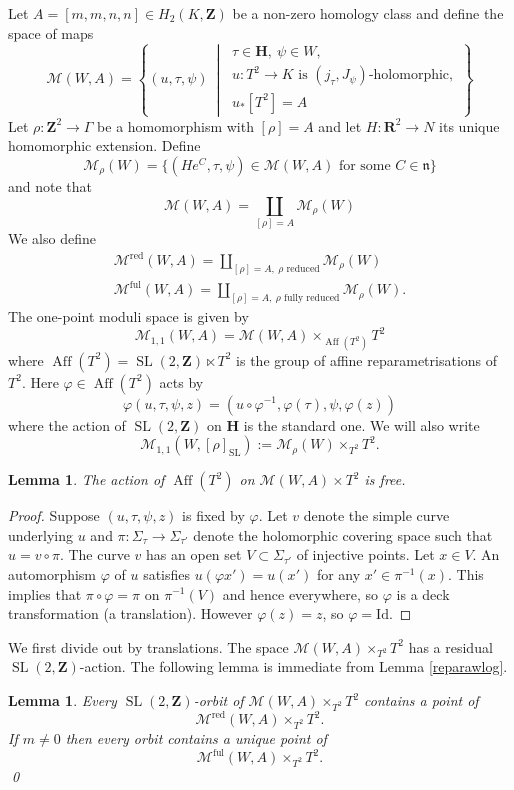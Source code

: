 \documentclass[11pt]{amsart}
\newcommand{\mM}{\mathcal{M}}
\newcommand{\HH}{\mathbf{H}}
\newcommand{\RR}{\mathbf{R}}
\newcommand{\ZZ}{\mathbf{Z}}
\newcommand{\id}{\mathrm{Id}}
\newcommand{\WW}{W}
\newcommand{\nn}{\mathfrak{n}}
\renewcommand{\phi}{\varphi}
\newcommand{\OP}{\operatorname}
\numberwithin{equation}{section}
\newtheorem{lma}[equation]{Lemma}
\theoremstyle{definition}
\theoremstyle{remark}
\begin{document}
Let $A=[m,m,n,n]\in H_2(K,\ZZ)$ be a non-zero homology class and define the space of maps
\[
\mM(\WW,A)=\left\{(u,\tau,\psi)\ \middle|\ \begin{array}{l}\tau\in\HH,\ \psi\in\WW,\\
u\colon T^2\to K\mbox{ is }(j_{\tau},J_{\psi})\mbox{-holomorphic},\\
u_*[T^2]=A\end{array}\right\}\]
Let $\rho\colon\ZZ^2\to\Gamma$ be a homomorphism with $[\rho]=A$ and let $H\colon\RR^2\to N$ its unique homomorphic extension. Define
\[\mM_{\rho}(\WW)=\{(He^C,\tau,\psi)\in\mM(\WW,A)\mbox{ for some }C\in\nn\}\]
and note that
\[\mM(\WW,A)=\coprod_{[\rho]=A}\mM_{\rho}(\WW)\]
We also define
\begin{gather*}
\mM^{\mathrm{red}}(\WW,A)=\coprod_{[\rho]=A,\ \rho\mbox{ reduced}}\mM_{\rho}(\WW)\\
\mM^{\mathrm{ful}}(\WW,A)=\coprod_{[\rho]=A,\ \rho\mbox{ fully reduced}}\mM_{\rho}(\WW).
\end{gather*} The one-point moduli space is given by
\[\mM_{1,1}(\WW,A)=\mM(\WW,A)\times_{\OP{Aff}(T^2)} T^2\]
where $\OP{Aff}(T^2)=\OP{SL}(2,\ZZ)\ltimes T^2$ is the group of affine reparametrisations of~$T^2$. Here $\phi\in\OP{Aff}(T^2)$ acts by
\[\phi(u,\tau,\psi,z)=(u\circ\phi^{-1},\phi(\tau),\psi,\phi(z))\]
where the action of $\OP{SL}(2,\ZZ)$ on $\HH$ is the standard one. We will also write
\[\mM_{1,1}(\WW,[\rho]_{\OP{SL}}):=\mM_{\rho}(\WW)\times_{T^2}T^2.\]
\begin{lma}\label{noautos}
The action of $\OP{Aff}(T^2)$ on $\mM(\WW,A)\times T^2$ is free.
\end{lma}
\begin{proof}
Suppose $(u,\tau,\psi,z)$ is fixed by $\phi$. Let $v$ denote the simple curve underlying $u$ and $\pi\colon \Sigma_{\tau}\to \Sigma_{\tau'}$ denote the holomorphic covering space such that $u=v\circ\pi$. The curve $v$ has an open set $V\subset\Sigma_{\tau'}$ of injective points. Let $x\in V$. An automorphism $\phi$ of $u$ satisfies $u(\phi x')=u(x')$ for any $x'\in\pi^{-1}(x)$. This implies that $\pi\circ\phi=\pi$ on $\pi^{-1}(V)$ and hence everywhere, so $\phi$ is a deck transformation (a translation). However $\phi(z)=z$, so $\phi=\id$.
\end{proof}
We first divide out by translations. The space $\mM(\WW,A)\times_{T^2}T^2$ has a residual $\OP{SL}(2,\ZZ)$-action. The following lemma is immediate from Lemma \ref{reparawlog}.
\begin{lma}\label{reduction}
Every $\OP{SL}(2,\ZZ)$-orbit of $\mM(\WW,A)\times_{T^2}T^2$ contains a point of
\[\mM^{\mathrm{red}}(\WW,A)\times_{T^2}T^2.\]
If $m\neq 0$ then every orbit contains a unique point of
\[\mM^{\mathrm{ful}}(\WW,A)\times_{T^2}T^2.\]
\qed
\end{lma}
\end{document}

